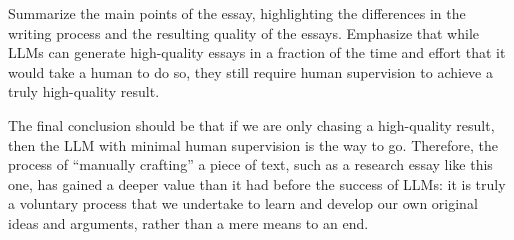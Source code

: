 \documentclass[11pt,a4paper]{article}
\begin{document}
Summarize the main points of the essay, highlighting the differences in the writing process and the resulting quality of the essays. Emphasize that while LLMs can generate high-quality essays in a fraction of the time and effort that it would take a human to do so, they still require human supervision to achieve a truly high-quality result.

The final conclusion should be that if we are only chasing a high-quality result, then the LLM with minimal human supervision is the way to go. Therefore, the process of ``manually crafting'' a piece of text, such as a research essay like this one, has gained a deeper value than it had before the success of LLMs: it is truly a voluntary process that we undertake to learn and develop our own original ideas and arguments, rather than a mere means to an end.

\clearpage
\nocite{*}
\printbibliography%
\end{document}
